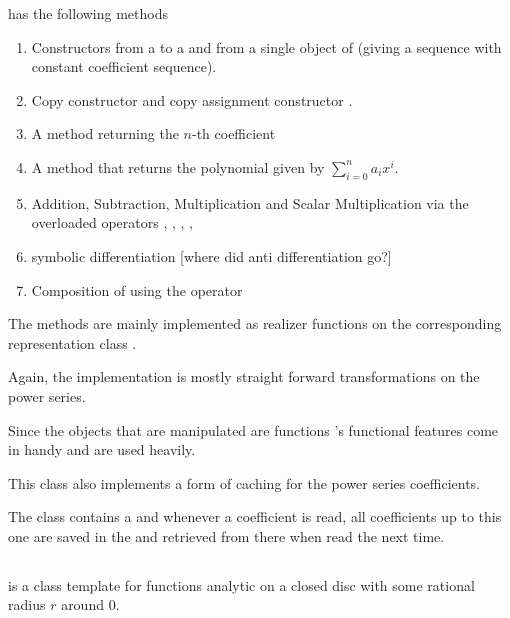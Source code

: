 			\powerseries has the following methods
			\begin{enumerate}
				\item Constructors from a  to a  and from a single object of  (giving a sequence with constant coefficient sequence).
				\item Copy constructor  and copy assignment constructor 
				.
				\item A method  returning the $n$-th coefficient
				\item A method  that returns the polynomial given by 
				$ \sum_{i=0}^n a_i x^i $.

				\item Addition, Subtraction, Multiplication and Scalar Multiplication via the overloaded operators \code{+}, \code{-}, \code{*}, \code{+=}, \code{*=}
				\item symbolic differentiation  [where did anti differentiation go?]
				\item Composition of \powerseries using the operator \code{()}
			\end{enumerate}
			The methods are mainly implemented as realizer functions on the corresponding representation class . 

			Again, the implementation is mostly straight forward transformations on the power series. 

			Since the objects that are manipulated are functions {\ccx}'s functional features come in handy and are used heavily. 		

      This class also implements a form of caching for the power series coefficients.
      
      The  class contains a  and whenever
      a coefficient is read, all coefficients up to this one are saved in the  and retrieved from there when read the next time.

	\subsection{\baana}
		\textbf{} is a class template for functions analytic on a closed disc with some rational radius $r$ around $0$. 

